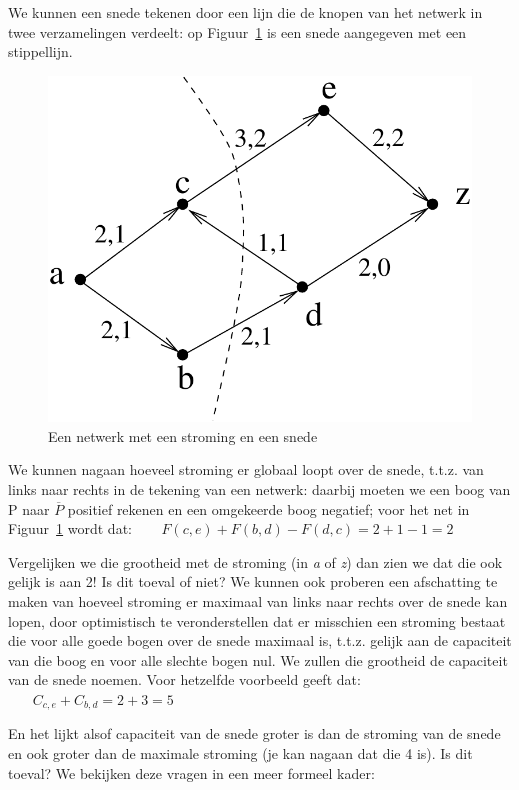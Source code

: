 
We kunnen een snede tekenen door een lijn die de knopen van het
netwerk in twee verzamelingen verdeelt: op Figuur~\ref{snede1} is een
snede aangegeven met een stippellijn.

\begin{figure}[ht]
\begin{center}
\includegraphics[width=0.3\linewidth,keepaspectratio]{snede1} %
\end{center}
\caption{Een netwerk met een stroming en een snede\label{snede1}}
\end{figure}

We kunnen nagaan hoeveel stroming er globaal loopt over de snede,
t.t.z. van links naar rechts in de tekening van een netwerk: daarbij
moeten we een boog van P naar $\overline{P}$ positief rekenen en een
omgekeerde boog negatief; voor het net in Figuur~\ref{snede1} wordt
dat: \mbox{$~~~~~~~~F(c,e) + F(b,d) - F(d,c) = 2+1-1=2$ }

Vergelijken we die grootheid met de stroming (in {\em a} of {\em z}) dan zien we
dat die ook gelijk is aan 2! Is dit toeval of niet? We kunnen ook
proberen een afschatting te maken van hoeveel stroming er maximaal van
links naar rechts over de snede kan lopen, door optimistisch te
veronderstellen dat er misschien een stroming bestaat die voor alle
goede bogen over de snede maximaal is, t.t.z. gelijk aan de capaciteit
van die boog en voor alle slechte bogen nul. We zullen die grootheid
de capaciteit van de snede noemen. Voor hetzelfde voorbeeld geeft dat: 
\mbox{$~~~~~~~~C_{c,e} + C_{b,d} = 2+3=5$}

En het lijkt alsof capaciteit van de snede groter is dan de stroming
van de snede en ook groter dan de maximale stroming (je kan nagaan dat
die 4 is). Is dit toeval? We bekijken deze vragen in een meer
formeel kader:

